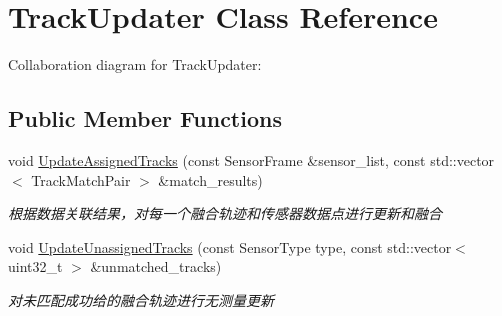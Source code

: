 \hypertarget{classTrackUpdater}{}\section{Track\+Updater Class Reference}
\label{classTrackUpdater}


Collaboration diagram for Track\+Updater\+:
\subsection*{Public Member Functions}
\begin{DoxyCompactItemize}
\item 
void \hyperlink{classTrackUpdater_a30026dd9e3cb157952dd5e373d4dc2f2}{Update\+Assigned\+Tracks} (const Sensor\+Frame \&sensor\+\_\+list, const std\+::vector$<$ Track\+Match\+Pair $>$ \&match\+\_\+results)
\begin{DoxyCompactList}\small\item\em 根据数据关联结果，对每一个融合轨迹和传感器数据点进行更新和融合 \end{DoxyCompactList}\item 
void \hyperlink{classTrackUpdater_acc0d0b3a043fb6e011f0a4432d266916}{Update\+Unassigned\+Tracks} (const Sensor\+Type type, const std\+::vector$<$ uint32\+\_\+t $>$ \&unmatched\+\_\+tracks)
\begin{DoxyCompactList}\small\item\em 对未匹配成功给的融合轨迹进行无测量更新 \end{DoxyCompactList}\end{DoxyCompactItemize}
